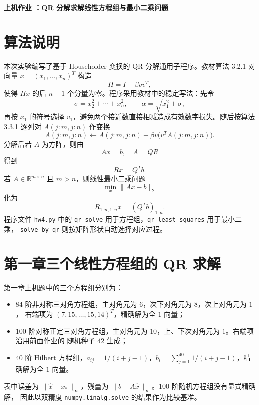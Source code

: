 \documentclass[a4paper,11pt]{article}
\begin{document}
\begin{center}
    \Large\textbf{上机作业 ：QR 分解求解线性方程组与最小二乘问题}
\end{center}

\section{算法说明}
本次实验编写了基于 Householder 变换的 QR 分解通用子程序。教材算法 3.2.1 对向量
$x=(x_1,\ldots,x_n)^T$ 构造
\[
    H=I-\beta vv^T,
\]
使得 $Hx$ 的后 $n-1$ 个分量为零。程序采用教材中的稳定写法：先令
\[
    \sigma=x_2^2+\cdots+x_n^2,\qquad
    \alpha=\sqrt{x_1^2+\sigma},
\]
再按 $x_1$ 的符号选择 $v_1$，避免两个接近数直接相减造成有效数字损失。随后按算法 3.3.1
逐列对 $A(j:m,j:n)$ 作变换
\[
    A(j:m,j:n)\leftarrow A(j:m,j:n)-\beta v\bigl(v^T A(j:m,j:n)\bigr).
\]
分解后若 $A$ 为方阵，则由
\[
    Ax=b,\quad A=QR
\]
得到
\[
    Rx=Q^Tb.
\]
若 $A\in\mathbb{R}^{m\times n}$ 且 $m>n$，则线性最小二乘问题
\[
    \min_x \|Ax-b\|_2
\]
化为
\[
    R_{1:n,1:n}x=(Q^Tb)_{1:n}.
\]
程序文件 \verb|hw4.py| 中的 \verb|qr_solve| 用于方程组，\verb|qr_least_squares| 用于最小二乘，
\verb|solve_by_qr| 则按矩阵形状自动选择对应过程。

\section{第一章三个线性方程组的 QR 求解}
第一章上机题中的三个方程组分别为：
\begin{itemize}
    \item 84 阶非对称三对角方程组，主对角元为 $6$，次下对角元为 $8$，次上对角元为 $1$，
    右端项为 $(7,15,\ldots,15,14)^T$，精确解为全 $1$ 向量；
    \item 100 阶对称正定三对角方程组，主对角元为 $10$，上、下次对角元为 $1$。右端项沿用前面作业的
    随机种子 $42$ 生成；
    \item 40 阶 Hilbert 方程组，$a_{ij}=1/(i+j-1)$，$b_i=\sum_{j=1}^{40}1/(i+j-1)$，精确解为全 $1$ 向量。
\end{itemize}

表中误差为 $\|\hat x-x_\ast\|_\infty$，残量为 $\|b-A\hat x\|_\infty$。100 阶随机方程组没有显式精确解，
因此以双精度 \verb|numpy.linalg.solve| 的结果作为比较基准。
\end{document}
